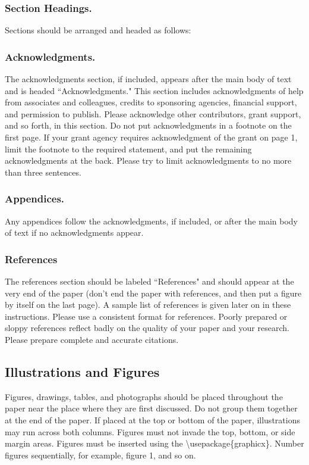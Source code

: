 \documentclass[letterpaper]{article}
\begin{document}
\subsubsection{Section Headings.}
Sections should be arranged and headed as follows: 

\subsubsection{Acknowledgments.}
The acknowledgments section, if included, appears after the main body of text and is headed ``Acknowledgments." This section includes acknowledgments of help from associates and colleagues, credits to sponsoring agencies, financial support, and permission to publish. Please acknowledge other contributors, grant support, and so forth, in this section. Do not put acknowledgments in a footnote on the first page. If your grant agency requires acknowledgment of the grant on page 1, limit the footnote to the required statement, and put the remaining acknowledgments at the back. Please try to limit acknowledgments to no more than three sentences. 

\subsubsection{Appendices.}
Any appendices follow the acknowledgments, if included, or after the main body of text if no acknowledgments appear. 

\subsubsection{References}
The references section should be labeled ``References" and should appear at the very end of the paper (don't end the paper with references, and then put a figure by itself on the last page). A sample list of references is given later on in these instructions. Please use a consistent format for references. Poorly prepared or sloppy references reflect badly on the quality of your paper and your research. Please prepare complete and accurate citations.

\subsection{Illustrations and Figures}
Figures, drawings, tables, and photographs should be placed throughout the paper near the place where they are first discussed. Do not group them together at the end of the paper. If placed at the top or bottom of the paper, illustrations may run across both columns. Figures must not invade the top, bottom, or side margin areas. Figures must be inserted using the \textbackslash usepackage\{graphicx\}. Number figures sequentially, for example, figure 1, and so on. 
\end{document}
